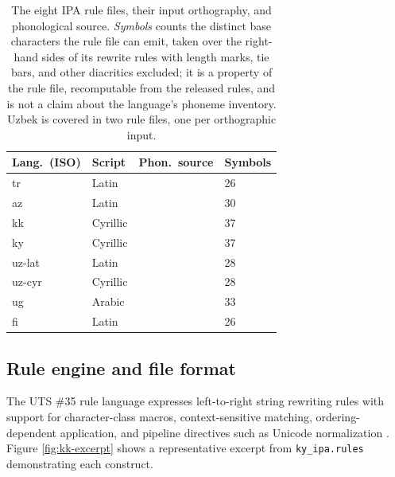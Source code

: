 \begin{table}[t]
\small
\centering
\begin{tabular}{@{}llll@{}}
\toprule
Lang.\ (ISO)  & Script          & Phon.\ source                       & Symbols \\
\midrule
tr            & Latin           & \citet{zimmer1992turkish}           & 26      \\
az            & Latin           & \citet{mokari2017azerbaijani}       & 30      \\
kk            & Cyrillic        & \citet{mccollum2021kazakh}          & 37      \\
ky            & Cyrillic        & \citet{mccollum2020vowel}           & 37      \\
uz-lat        & Latin           & \citet{ido2025uzbek}                & 28      \\
uz-cyr        & Cyrillic        & \citet{ido2025uzbek}                & 28      \\
ug            & Arabic          & \citet{mccollum2021transparency}    & 33      \\
fi            & Latin           & \citet{suomi2009finnish}            & 26      \\
\bottomrule
\end{tabular}
\caption{The eight IPA rule files, their input orthography, and phonological source. \emph{Symbols} counts the distinct base characters the rule file can emit, taken over the right-hand sides of its rewrite rules with length marks, tie bars, and other diacritics excluded; it is a property of the rule file, recomputable from the released rules, and is not a claim about the language's phoneme inventory. Uzbek is covered in two rule files, one per orthographic input.}
\label{tab:ipa-sources}
\end{table}

\subsection{Rule engine and file format}
\label{sec:ipa-engine}

The UTS \#35 rule language expresses left-to-right string rewriting rules with support for character-class macros, context-sensitive matching, ordering-dependent application, and pipeline directives such as Unicode normalization \citep{unicode-uts35}. Figure \ref{fig:kk-excerpt} shows a representative excerpt from \texttt{ky\_ipa.rules} demonstrating each construct.

